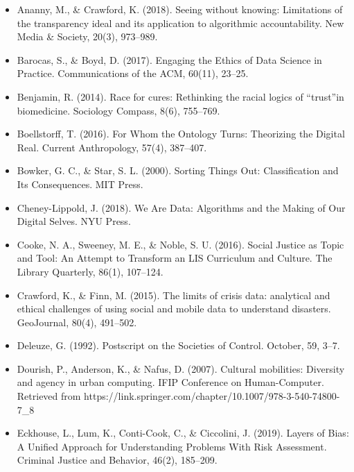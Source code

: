 \documentclass[a4paper,man,natbib]{apa6}
\begin{document}
   \begin{itemize}[label={},itemindent=-2em,leftmargin=2em]
   \item Ananny, M., \& Crawford, K. (2018). Seeing without knowing: Limitations of the transparency ideal and its application to algorithmic accountability. New Media \& Society, 20(3), 973–989.

   \item Barocas, S., \& Boyd, D. (2017). Engaging the Ethics of Data Science in Practice. Communications of the ACM, 60(11), 23–25.

   \item Benjamin, R. (2014). Race for cures: Rethinking the racial logics of “trust”in biomedicine. Sociology Compass, 8(6), 755–769.

   \item Boellstorff, T. (2016). For Whom the Ontology Turns: Theorizing the Digital Real. Current Anthropology, 57(4), 387–407.

   \item Bowker, G. C., \& Star, S. L. (2000). Sorting Things Out: Classification and Its Consequences. MIT Press.

   \item Cheney-Lippold, J. (2018). We Are Data: Algorithms and the Making of Our Digital Selves. NYU Press.

   \item Cooke, N. A., Sweeney, M. E., \& Noble, S. U. (2016). Social Justice as Topic and Tool: An Attempt to Transform an LIS Curriculum and Culture. The Library Quarterly, 86(1), 107–124.

   \item Crawford, K., \& Finn, M. (2015). The limits of crisis data: analytical and ethical challenges of using social and mobile data to understand disasters. GeoJournal, 80(4), 491–502.

   \item Deleuze, G. (1992). Postscript on the Societies of Control. October, 59, 3–7.

   \item Dourish, P., Anderson, K., \& Nafus, D. (2007). Cultural mobilities: Diversity and agency in urban computing. IFIP Conference on Human-Computer. Retrieved from https://link.springer.com/chapter/10.1007/978-3-540-74800-7\_8

   \item Eckhouse, L., Lum, K., Conti-Cook, C., \& Ciccolini, J. (2019). Layers of Bias: A Unified Approach for Understanding Problems With Risk Assessment. Criminal Justice and Behavior, 46(2), 185–209.


\end{itemize}
\end{document}
